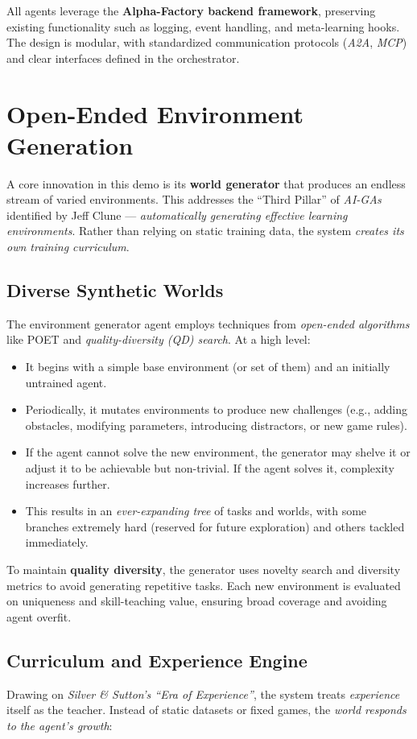 \documentclass{article}
\begin{document}
\noindent All agents leverage the \textbf{Alpha-Factory backend framework}, preserving existing functionality such as logging, event handling, and meta-learning hooks. The design is modular, with standardized communication protocols (\emph{A2A}, \emph{MCP}) and clear interfaces defined in the orchestrator.

\section{Open-Ended Environment Generation}
A core innovation in this demo is its \textbf{world generator} that produces an endless stream of varied environments. This addresses the “Third Pillar” of \emph{AI-GAs} identified by Jeff Clune — \emph{automatically generating effective learning environments}. Rather than relying on static training data, the system \emph{creates its own training curriculum}.

\subsection{Diverse Synthetic Worlds}
The environment generator agent employs techniques from \emph{open-ended algorithms} like POET and \emph{quality-diversity (QD) search}. At a high level:

\begin{itemize}
  \item It begins with a simple base environment (or set of them) and an initially untrained agent.
  \item Periodically, it mutates environments to produce new challenges (e.g., adding obstacles, modifying parameters, introducing distractors, or new game rules).
  \item If the agent cannot solve the new environment, the generator may shelve it or adjust it to be achievable but non-trivial. If the agent solves it, complexity increases further.
  \item This results in an \emph{ever-expanding tree} of tasks and worlds, with some branches extremely hard (reserved for future exploration) and others tackled immediately.
\end{itemize}

To maintain \textbf{quality diversity}, the generator uses novelty search and diversity metrics to avoid generating repetitive tasks. Each new environment is evaluated on uniqueness and skill-teaching value, ensuring broad coverage and avoiding agent overfit.

\subsection{Curriculum and Experience Engine}
Drawing on \emph{Silver \& Sutton’s “Era of Experience”}, the system treats \emph{experience} itself as the teacher. Instead of static datasets or fixed games, the \emph{world responds to the agent’s growth}:
\end{document}
